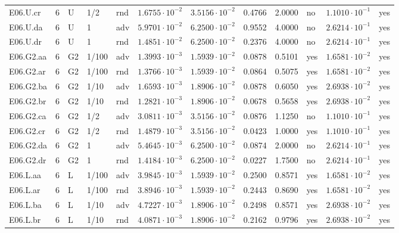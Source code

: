 {\begin{longtable}{@{}lllllllllll l@{}}
E06.U.cr & 6 & U & 1/2 & rnd & $1.6755\cdot 10^{-2}$ & $3.5156\cdot 10^{-2}$ & 0.4766 & 2.0000 & no & $1.1010\cdot 10^{-1}$ & yes \\
E06.U.da & 6 & U & 1 & adv & $5.9701\cdot 10^{-2}$ & $6.2500\cdot 10^{-2}$ & 0.9552 & 4.0000 & no & $2.6214\cdot 10^{-1}$ & yes \\
E06.U.dr & 6 & U & 1 & rnd & $1.4851\cdot 10^{-2}$ & $6.2500\cdot 10^{-2}$ & 0.2376 & 4.0000 & no & $2.6214\cdot 10^{-1}$ & yes \\
E06.G2.aa & 6 & G2 & 1/100 & adv & $1.3993\cdot 10^{-3}$ & $1.5939\cdot 10^{-2}$ & 0.0878 & 0.5101 & yes & $1.6581\cdot 10^{-2}$ & yes \\
E06.G2.ar & 6 & G2 & 1/100 & rnd & $1.3766\cdot 10^{-3}$ & $1.5939\cdot 10^{-2}$ & 0.0864 & 0.5075 & yes & $1.6581\cdot 10^{-2}$ & yes \\
E06.G2.ba & 6 & G2 & 1/10 & adv & $1.6593\cdot 10^{-3}$ & $1.8906\cdot 10^{-2}$ & 0.0878 & 0.6050 & yes & $2.6938\cdot 10^{-2}$ & yes \\
E06.G2.br & 6 & G2 & 1/10 & rnd & $1.2821\cdot 10^{-3}$ & $1.8906\cdot 10^{-2}$ & 0.0678 & 0.5658 & yes & $2.6938\cdot 10^{-2}$ & yes \\
E06.G2.ca & 6 & G2 & 1/2 & adv & $3.0811\cdot 10^{-3}$ & $3.5156\cdot 10^{-2}$ & 0.0876 & 1.1250 & no & $1.1010\cdot 10^{-1}$ & yes \\
E06.G2.cr & 6 & G2 & 1/2 & rnd & $1.4879\cdot 10^{-3}$ & $3.5156\cdot 10^{-2}$ & 0.0423 & 1.0000 & yes & $1.1010\cdot 10^{-1}$ & yes \\
E06.G2.da & 6 & G2 & 1 & adv & $5.4645\cdot 10^{-3}$ & $6.2500\cdot 10^{-2}$ & 0.0874 & 2.0000 & no & $2.6214\cdot 10^{-1}$ & yes \\
E06.G2.dr & 6 & G2 & 1 & rnd & $1.4184\cdot 10^{-3}$ & $6.2500\cdot 10^{-2}$ & 0.0227 & 1.7500 & no & $2.6214\cdot 10^{-1}$ & yes \\
E06.L.aa & 6 & L & 1/100 & adv & $3.9845\cdot 10^{-3}$ & $1.5939\cdot 10^{-2}$ & 0.2500 & 0.8571 & yes & $1.6581\cdot 10^{-2}$ & yes \\
E06.L.ar & 6 & L & 1/100 & rnd & $3.8946\cdot 10^{-3}$ & $1.5939\cdot 10^{-2}$ & 0.2443 & 0.8690 & yes & $1.6581\cdot 10^{-2}$ & yes \\
E06.L.ba & 6 & L & 1/10 & adv & $4.7227\cdot 10^{-3}$ & $1.8906\cdot 10^{-2}$ & 0.2498 & 0.8571 & yes & $2.6938\cdot 10^{-2}$ & yes \\
E06.L.br & 6 & L & 1/10 & rnd & $4.0871\cdot 10^{-3}$ & $1.8906\cdot 10^{-2}$ & 0.2162 & 0.9796 & yes & $2.6938\cdot 10^{-2}$ & yes \\

\end{longtable}}
